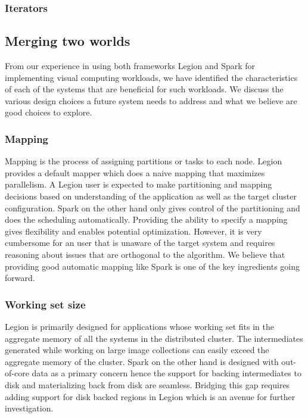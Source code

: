 \documentclass[tog]{acmsiggraph}
\begin{document}
\subsubsection{Iterators}

\subsection{Merging two worlds}

From our experience in using both frameworks Legion and Spark for implementing
visual computing workloads, we have identified the characteristics of each of
the systems that are beneficial for such workloads. We discuss the various
design choices a future system needs to address and what we believe are good
choices to explore.

\subsubsection{Mapping}
Mapping is the process of assigning partitions or tasks to each node. Legion
provides a default mapper which does a naive mapping that maximizes parallelism.
A Legion user is expected to make partitioning and mapping decisions based on
understanding of the application as well as the target cluster configuration.
Spark on the other hand only gives control of the partitioning and does the
scheduling automatically. Providing the ability to specify a mapping gives
flexibility and enables potential optimization. However, it is very cumbersome
for an user that is unaware of the target system and requires reasoning about
issues that are orthogonal to the algorithm. We believe that providing good
automatic mapping like Spark is one of the key ingredients going forward.

\subsubsection{Working set size}
Legion is primarily designed for applications whose working set fits in the
aggregate memory of all the systems in the distributed cluster. The
intermediates generated while working on large image collections can easily
exceed the aggregate memory of the cluster. Spark on the other hand is designed
with out-of-core data as a primary concern hence the support for backing
intermediates to disk and materializing back from disk are seamless. Bridging
this gap requires adding support for disk backed regions in Legion which is an
avenue for further investigation.
\end{document}
